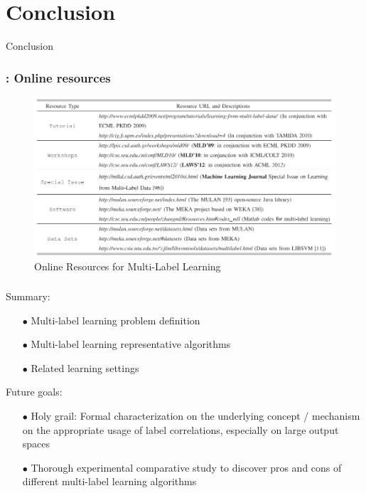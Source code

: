 \documentclass{beamer}
\begin{document}
\section{Conclusion}
\begin{frame}
\Huge{\centerline{Conclusion}}
\end{frame}
\begin{frame}
\frametitle{\insertsection : Online resources}
\begin{figure}
\begin{center}
\includegraphics[scale = 0.47]{images/online.png}
\caption{Online Resources for Multi-Label Learning}
\end{center}
\end{figure}
\end{frame}
\begin{frame}
\frametitle{\insertsection}
Summary:
\begin{itemize}
\item[$\bullet$] Multi-label learning problem definition
\item[$\bullet$] Multi-label learning representative algorithms
\item[$\bullet$] Related learning settings
\end{itemize}

Future goals:
\begin{itemize}
\item[$\bullet$] Holy grail: Formal characterization on the underlying concept / mechanism on the appropriate usage of label correlations, especially on large output spaces
\item[$\bullet$] Thorough experimental comparative study to discover pros and cons of different multi-label learning algorithms
\end{itemize}
\end{frame}
\end{document}
